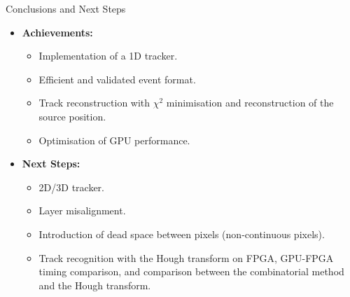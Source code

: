 \documentclass{beamer}
\begin{document}
\begin{frame}{Conclusions and Next Steps}
\begin{itemize}
    \item \textbf{Achievements:}
    \begin{itemize}
        \item  Implementation of a 1D tracker.
        \item  Efficient and validated event format.
        \item Track reconstruction with $\chi^2$ minimisation and reconstruction of the source position.
        \item Optimisation of GPU performance.
    \end{itemize}
    \item \textbf{Next Steps:}
    \begin{itemize}
        \item 2D/3D tracker.
        \item Layer misalignment.
        \item Introduction of dead space between pixels (non-continuous pixels).
        \item Track recognition with the Hough transform on FPGA, GPU-FPGA timing comparison, and comparison between the combinatorial method and the Hough transform.
    \end{itemize}
\end{itemize}
\end{frame}
\end{document}
